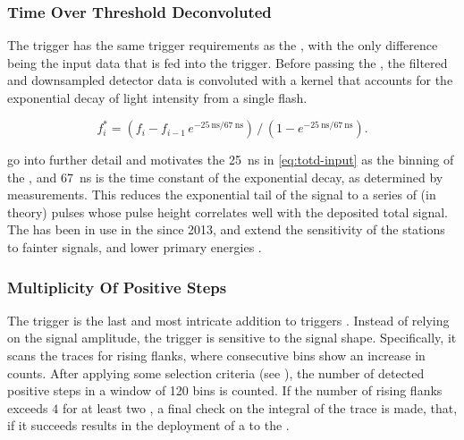 \subsubsection{Time Over Threshold Deconvoluted}

The \ToTd trigger has the same trigger requirements as the \ToT, with the only
difference being the input data that is fed into the trigger. Before passing 
the \ToTd, the filtered and downsampled detector data is convoluted with a 
kernel that accounts for the exponential decay of light intensity from a single
flash.

\begin{equation}
\label{eq:totd-input}
f^*_i = \left( f_i - f_{i-1} \, e^{-\SI{25}{\nano\second}/\SI{67}{\nano\second}} \right)\,/\,\left( 1 - e^{-\SI{25}{\nano\second}/\SI{67}{\nano\second} } \right).
\end{equation}

\cite{billoirPeakSearchingSurface2002, colemanNewTriggerSettings2018} go into 
further detail and motivates the \SI{25}{\nano\second} in \cref{eq:totd-input} 
as the binning of the \UB, and \SI{67}{\nano\second} is the time constant of 
the exponential decay, as determined by measurements. This reduces the 
exponential tail of the \WCD signal to a series of (in theory) \SB pulses whose
pulse height correlates well with the deposited total signal. The \ToTd has 
been in use in the \SD since 2013, and extend the sensitivity of the \SD 
stations to fainter signals, and lower \EAS primary energies 
\cite{billoirFirstResultsToTd2013}.

\subsubsection{Multiplicity Of Positive Steps}

The \MoPS trigger is the last and most intricate addition to \SD \TTWO triggers
\cite{billoirPropositionImproveLocal13}. Instead of relying on the \WCD signal
amplitude, the \MoPS trigger is sensitive to the signal shape. Specifically, it
scans the \LPMT traces for rising flanks, where consecutive bins show an
increase in \ADC counts. After applying some selection criteria (see 
\cite{colemanNewTriggerSettings2018}), the number of detected positive steps
in a window of 120 bins is counted. If the number of rising flanks exceeds $4$ 
for at least two \LPMTs, a final check on the integral of the \FDS trace is 
made, that, if it succeeds results in the deployment of a \TTWO to the \CDAS.

